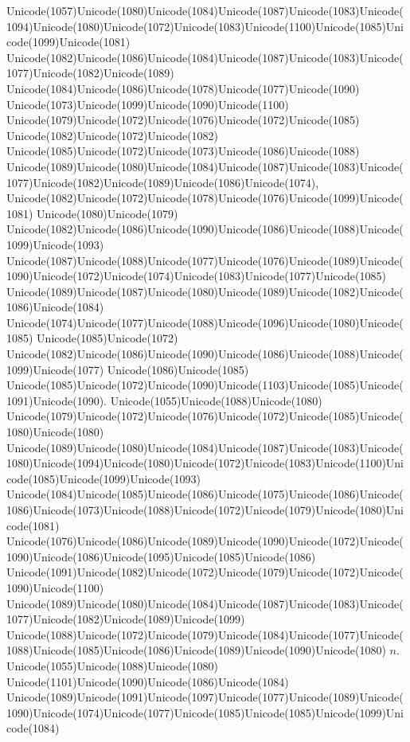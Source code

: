 \documentclass[a4paper,11pt]{report}
\begin{document}
{{ Unicode(1057)Unicode(1080)Unicode(1084)Unicode(1087)Unicode(1083)Unicode(1094)Unicode(1080)Unicode(1072)Unicode(1083)Unicode(1100)Unicode(1085)Unicode(1099)Unicode(1081)
Unicode(1082)Unicode(1086)Unicode(1084)Unicode(1087)Unicode(1083)Unicode(1077)Unicode(1082)Unicode(1089)
Unicode(1084)Unicode(1086)Unicode(1078)Unicode(1077)Unicode(1090)
Unicode(1073)Unicode(1099)Unicode(1090)Unicode(1100)
Unicode(1079)Unicode(1072)Unicode(1076)Unicode(1072)Unicode(1085)
Unicode(1082)Unicode(1072)Unicode(1082)
Unicode(1085)Unicode(1072)Unicode(1073)Unicode(1086)Unicode(1088)
Unicode(1089)Unicode(1080)Unicode(1084)Unicode(1087)Unicode(1083)Unicode(1077)Unicode(1082)Unicode(1089)Unicode(1086)Unicode(1074),
Unicode(1082)Unicode(1072)Unicode(1078)Unicode(1076)Unicode(1099)Unicode(1081)
Unicode(1080)Unicode(1079)
Unicode(1082)Unicode(1086)Unicode(1090)Unicode(1086)Unicode(1088)Unicode(1099)Unicode(1093)
Unicode(1087)Unicode(1088)Unicode(1077)Unicode(1076)Unicode(1089)Unicode(1090)Unicode(1072)Unicode(1074)Unicode(1083)Unicode(1077)Unicode(1085)
Unicode(1089)Unicode(1087)Unicode(1080)Unicode(1089)Unicode(1082)Unicode(1086)Unicode(1084)
Unicode(1074)Unicode(1077)Unicode(1088)Unicode(1096)Unicode(1080)Unicode(1085)
Unicode(1085)Unicode(1072)
Unicode(1082)Unicode(1086)Unicode(1090)Unicode(1086)Unicode(1088)Unicode(1099)Unicode(1077)
Unicode(1086)Unicode(1085)
Unicode(1085)Unicode(1072)Unicode(1090)Unicode(1103)Unicode(1085)Unicode(1091)Unicode(1090).
Unicode(1055)Unicode(1088)Unicode(1080)
Unicode(1079)Unicode(1072)Unicode(1076)Unicode(1072)Unicode(1085)Unicode(1080)Unicode(1080)
Unicode(1089)Unicode(1080)Unicode(1084)Unicode(1087)Unicode(1083)Unicode(1080)Unicode(1094)Unicode(1080)Unicode(1072)Unicode(1083)Unicode(1100)Unicode(1085)Unicode(1099)Unicode(1093)
Unicode(1084)Unicode(1085)Unicode(1086)Unicode(1075)Unicode(1086)Unicode(1086)Unicode(1073)Unicode(1088)Unicode(1072)Unicode(1079)Unicode(1080)Unicode(1081)
Unicode(1076)Unicode(1086)Unicode(1089)Unicode(1090)Unicode(1072)Unicode(1090)Unicode(1086)Unicode(1095)Unicode(1085)Unicode(1086)
Unicode(1091)Unicode(1082)Unicode(1072)Unicode(1079)Unicode(1072)Unicode(1090)Unicode(1100)
Unicode(1089)Unicode(1080)Unicode(1084)Unicode(1087)Unicode(1083)Unicode(1077)Unicode(1082)Unicode(1089)Unicode(1099)
Unicode(1088)Unicode(1072)Unicode(1079)Unicode(1084)Unicode(1077)Unicode(1088)Unicode(1085)Unicode(1086)Unicode(1089)Unicode(1090)Unicode(1080) $n.$ Unicode(1055)Unicode(1088)Unicode(1080)
Unicode(1101)Unicode(1090)Unicode(1086)Unicode(1084)
Unicode(1089)Unicode(1091)Unicode(1097)Unicode(1077)Unicode(1089)Unicode(1090)Unicode(1074)Unicode(1077)Unicode(1085)Unicode(1085)Unicode(1099)Unicode(1084)
}}
\end{document}
